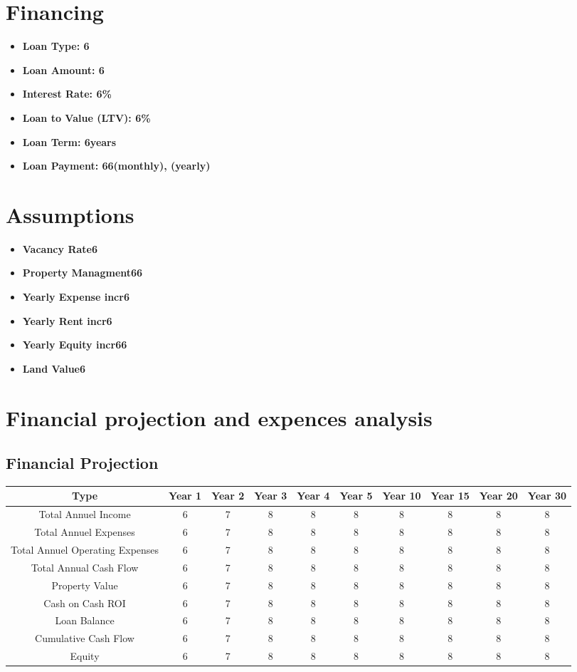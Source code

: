 \documentclass{article}%
\begin{document}
%
\section{Financing}%
\label{sec:Financing}%
\begin{itemize}%
\item%
\textbf{Loan Type: 6}%
\item%
\textbf{Loan Amount: 6}%
\item%
\textbf{Interest Rate: 6\%}%
\item%
\textbf{Loan to Value (LTV): 6\%}%
\item%
\textbf{Loan Term: 6years}%
\item%
\textbf{Loan Payment: 66(monthly), (yearly)}%
\end{itemize}

%
\section{Assumptions}%
\label{sec:Assumptions}%
\begin{itemize}%
\item%
\textbf{Vacancy Rate6}%
\item%
\textbf{Property Managment66}%
\item%
\textbf{Yearly Expense incr6}%
\item%
\textbf{Yearly Rent incr6}%
\item%
\textbf{Yearly Equity incr66}%
\item%
\textbf{Land Value6}%
\end{itemize}%
\section{Financial projection and expences analysis}%
\label{sec:Financialprojectionandexpencesanalysis}%
\subsection{\textbf{Financial Projection}}%
\label{subsec:textbfFinancialProjection}%
\begin{tabular}{|c|c|c|c|c|c|c|c|c|c|}%
\hline%
Type&Year 1&Year 2&Year 3&Year 4&Year 5&Year 10&Year 15&Year 20&Year 30\\%
\hline%
Total Annuel Income&6&7&8&8&8&8&8&8&8\\%
\hline%
Total Annuel Expenses&6&7&8&8&8&8&8&8&8\\%
\hline%
Total Annuel Operating Expenses&6&7&8&8&8&8&8&8&8\\%
\hline%
Total Annual Cash Flow&6&7&8&8&8&8&8&8&8\\%
\hline%
Property Value&6&7&8&8&8&8&8&8&8\\%
\hline%
Cash on Cash ROI&6&7&8&8&8&8&8&8&8\\%
\hline%
Loan Balance&6&7&8&8&8&8&8&8&8\\%
\hline%
Cumulative Cash Flow&6&7&8&8&8&8&8&8&8\\%
\hline%
Equity&6&7&8&8&8&8&8&8&8\\%
\hline%
\end{tabular}
\end{document}
